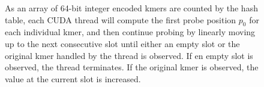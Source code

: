 \begin{figure}[ht!]
\begin{center}
{
}
\caption{As an array of 64-bit integer encoded kmers are counted by the hash table, each CUDA thread will compute the first probe position $p_0$ for each individual kmer, and then continue probing by linearly moving up to the next consecutive slot until either an empty slot or the original kmer handled by the thread is observed. If en empty slot is observed, the thread terminates. If the original kmer is observed, the value at the current slot is increased.}
\label{figure:cucounter_hashtable_probing}
\end{center}
\end{figure}

